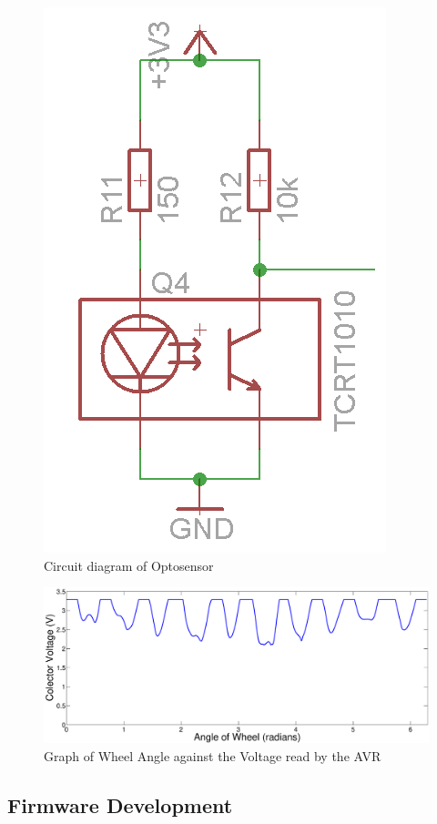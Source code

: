 \begin{figure}
\centering
\includegraphics[scale=0.5]{Figures/TCRT_Circuit.png}
\caption{Circuit diagram of Optosensor}
\label{Circuit:TCRT1010}
\end{figure}

\begin{figure}
\includegraphics[width = \textwidth]{Figures/WheelVoltageGraph.eps}
\caption{Graph of Wheel Angle against the Voltage read by the AVR}
\label{Graph:WheelVoltage}
\end{figure}
 

\subsection{Firmware Development}

